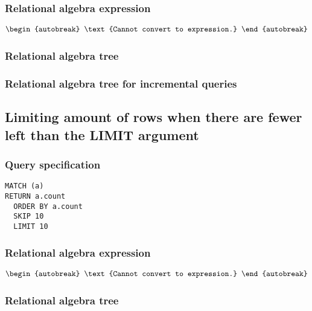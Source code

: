 \subsubsection*{Relational algebra expression}

\begin{align*}
\begin{autobreak}
\text{Cannot convert to expression.}
\end{autobreak}
\end{align*}

\subsubsection*{Relational algebra tree}


\subsubsection*{Relational algebra tree for incremental queries}


\subsection{Limiting amount of rows when there are fewer left than the LIMIT argument}

\subsubsection*{Query specification}

\begin{lstlisting}
MATCH (a)
RETURN a.count
  ORDER BY a.count
  SKIP 10
  LIMIT 10
\end{lstlisting}

\subsubsection*{Relational algebra expression}

\begin{align*}
\begin{autobreak}
\text{Cannot convert to expression.}
\end{autobreak}
\end{align*}

\subsubsection*{Relational algebra tree}

